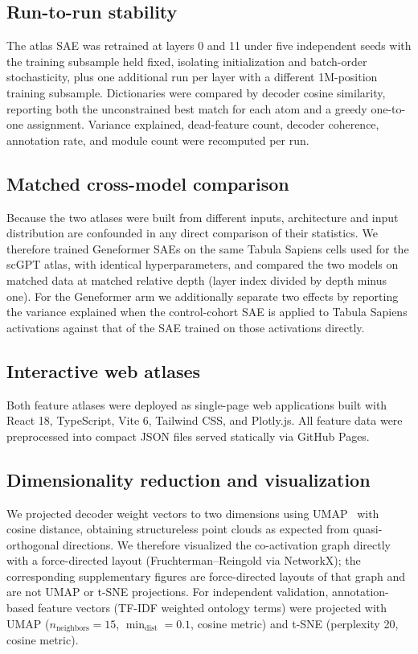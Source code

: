 \documentclass[onecolumn,11pt]{article}
\begin{document}
\subsection*{Run-to-run stability}

The atlas SAE was retrained at layers 0 and 11 under five independent seeds with the
training subsample held fixed, isolating initialization and batch-order stochasticity, plus one
additional run per layer with a different 1M-position training subsample. Dictionaries were compared
by decoder cosine similarity, reporting both the unconstrained best match for each atom and a greedy
one-to-one assignment. Variance explained, dead-feature count, decoder coherence, annotation rate,
and module count were recomputed per run.

\subsection*{Matched cross-model comparison}

Because the two atlases were built from different inputs, architecture and input distribution are
confounded in any direct comparison of their statistics. We therefore trained Geneformer SAEs on the
same Tabula Sapiens cells used for the scGPT atlas, with identical hyperparameters, and compared the
two models on matched data at matched relative depth (layer index divided by depth minus one). For
the Geneformer arm we additionally separate two effects by reporting the variance explained when the
control-cohort SAE is applied to Tabula Sapiens activations against that of the SAE trained on those
activations directly.

\subsection*{Interactive web atlases}

Both feature atlases were deployed as single-page web applications built with React 18, TypeScript,
Vite 6, Tailwind CSS, and Plotly.js. All feature data were preprocessed into compact JSON files
served statically via GitHub Pages.

\subsection*{Dimensionality reduction and visualization}

We projected decoder weight vectors to two dimensions using UMAP~\cite{mcinnes2018umap} with cosine
distance, obtaining structureless point clouds as expected from quasi-orthogonal directions. We
therefore visualized the co-activation graph directly with a force-directed layout
(Fruchterman--Reingold via NetworkX); the corresponding supplementary figures are force-directed
layouts of that graph and are not UMAP or t-SNE projections. For independent validation,
annotation-based feature vectors (TF-IDF weighted ontology terms) were projected with UMAP
($n_\text{neighbors}=15$, $\min_\text{dist}=0.1$, cosine metric) and t-SNE (perplexity 20, cosine
metric).
\end{document}
